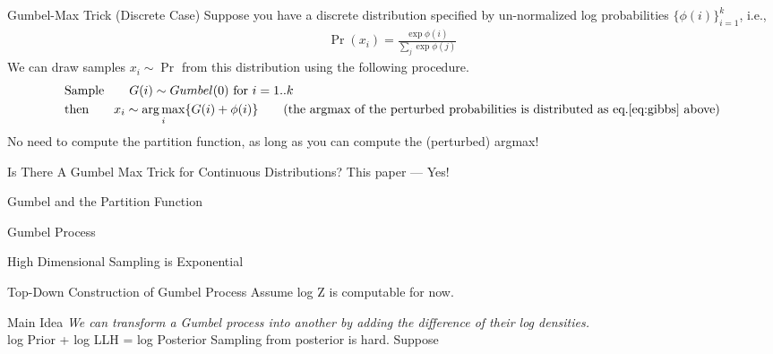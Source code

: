 \begin{frame}{Gumbel-Max Trick (Discrete Case)}
  Suppose you have a discrete distribution specified by un-normalized log probabilities $\{\phi(i)\}_{i=1}^{k}$, i.e.,
  \begin{align}
    \Pr(x_i) = \frac{\exp\phi(i)}{\sum_j\exp\phi(j)} \label{eq:gibbs}
  \end{align}
  We can draw samples $x_i \sim \Pr$ from this distribution using the following procedure.
  \begin{align*}
    & \text{Sample} \qquad G(i) \sim Gumbel(0) \text{ for } i=1..k\\
    & \text{then} \qquad x_i \sim \argmax_i \{G(i) +\phi(i)\} \tag{the argmax of the perturbed probabilities is distributed as eq.\ref{eq:gibbs} above}
  \end{align*}
  No need to compute the partition function, as long as you can compute the (perturbed) argmax!
\end{frame}

\begin{frame}{Is There A Gumbel Max Trick for Continuous Distributions?}
  This paper --- Yes!
\end{frame}

\begin{frame}{Gumbel and the Partition Function}
  
\end{frame}

\begin{frame}{Gumbel Process}
\end{frame}

\begin{frame}{High Dimensional Sampling is Exponential}

\end{frame}

\begin{frame}{Top-Down Construction of Gumbel Process}
  Assume log Z is computable for now.
\end{frame}

\begin{frame}{Main Idea}
  \emph{We can transform a Gumbel process into another by adding the difference of their log densities.} \\
  log Prior + log LLH = log Posterior
  Sampling from posterior is hard.
  Suppose 
\end{frame}

